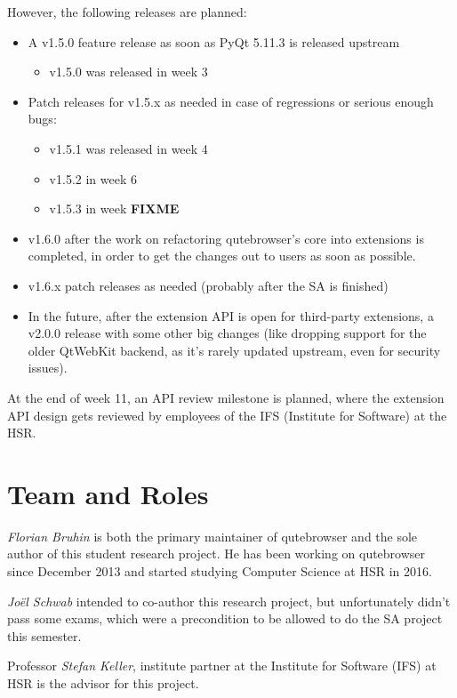 \documentclass[a4paper,parskip=full,DIV=14,BCOR=15mm]{scrreprt}
\newcommand{\fixme}[1]{\textbf{FIXME} \emph{#1}}
\begin{document}
However, the following releases are planned:

\begin{itemize}
  \item A v1.5.0 feature release as soon as PyQt 5.11.3 is released upstream
    \begin{itemize}
      \item v1.5.0 was released in week 3
    \end{itemize}
  \item Patch releases for v1.5.x as needed in case of regressions or serious
    enough bugs:
    \begin{itemize}
      \item v1.5.1 was released in week 4
      \item v1.5.2 in week 6
      \item v1.5.3 in week \fixme{}
    \end{itemize}
  \item v1.6.0 after the work on refactoring qutebrowser's core into extensions
    is completed, in order to get the changes out to users as soon as possible.
  \item v1.6.x patch releases as needed (probably after the SA is finished)
  \item In the future, after the extension API is open for third-party
    extensions, a v2.0.0 release with some other big changes (like dropping support
    for the older QtWebKit backend, as it's rarely updated upstream, even for
    security issues).
\end{itemize}

At the end of week 11, an API review milestone is planned, where the extension
API design gets reviewed by employees of the IFS (Institute for Software) at the
HSR.

\section{Team and Roles}
\emph{Florian Bruhin} is both the primary maintainer of qutebrowser and the
sole author of this student research project. He has been working on qutebrowser since
December 2013 and started studying Computer Science at HSR in 2016.

\emph{Joël Schwab} intended to co-author this research project, but
unfortunately didn't pass some exams, which were a precondition to be allowed to
do the SA project this semester.

Professor \emph{Stefan Keller}, institute partner at the Institute for Software
(IFS) at HSR is the advisor for this project.
\end{document}
